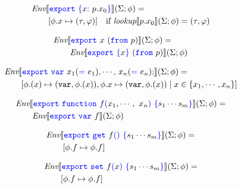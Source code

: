 \documentclass[a4paper]{article}
\newcommand{\code}[1]{\textcolor{blue}{\tt #1}}
\newcommand{\var}{{\tt{var}}}
\newcommand{\Env}{\emph{Env}}
\newcommand{\lookup}{\emph{lookup}}
\newcommand{\If}{\mbox{if}}
\begin{document}
\begin{equation*}
\begin{split}
&\Env \llbracket \code{export}\ \code{\{}x\code{:}\ p.x_0\code{\}} \rrbracket (\Sigma; \phi) = \\
&\qquad [\phi.x \mapsto (\tau, \varphi)] \quad \If\ \lookup \llbracket p.x_0 \rrbracket (\Sigma; \phi) = (\tau, \varphi)
\end{split}
\end{equation*}

\begin{equation*}
\begin{split}
&\Env \llbracket \code{export}\ x\ (\code{from}\ p) \rrbracket (\Sigma; \phi) = \\
&\qquad \Env \llbracket \code{export}\ \code{\{}x\code{\}}\ (\code{from}\ p) \rrbracket (\Sigma; \phi)
\end{split}
\end{equation*}

\begin{equation*}
\begin{split}
&\Env \llbracket \code{export}\ \code{var}\ x_1(\code{=}\ e_1)\code{,} \cdots \code{,}\ x_n(\code{=}\ e_n)\code{;} \rrbracket (\Sigma; \phi) = \\
&\qquad [\phi.(x) \mapsto (\var, \phi.(x)), \phi.x \mapsto (\var, \phi.(x)) \mid x \in \{ x_1, \cdots, x_n \}]
\end{split}
\end{equation*}

\begin{equation*}
\begin{split}
&\Env \llbracket \code{export}\ \code{function}\ f\code{(}x_1, \cdots,\ x_n\code{)}\ \code{\{} s_1 \cdots s_m \code{\}} \rrbracket (\Sigma; \phi) = \\
&\qquad \Env \llbracket \code{export}\ \code{var}\ f \rrbracket (\Sigma; \phi)
\end{split}
\end{equation*}

\begin{equation*}
\begin{split}
&\Env \llbracket \code{export}\ \code{get}\ f\code{()}\ \code{\{} s_1 \cdots s_m \code{\}} \rrbracket (\Sigma; \phi) = \\
&\qquad [\phi.f \mapsto \phi.f]
\end{split}
\end{equation*}

\begin{equation*}
\begin{split}
&\Env \llbracket \code{export}\ \code{set}\ f\code{(}x\code{)}\ \code{\{} s_1 \cdots s_m \code{\}} \rrbracket (\Sigma; \phi) = \\
&\qquad [\phi.f \mapsto \phi.f]
\end{split}
\end{equation*}
\end{document}
